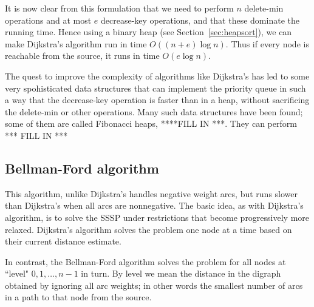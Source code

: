 It is now clear from this formulation that we need to perform $n$
delete-min operations and at most $e$ decrease-key operations, and
that these dominate the running time. Hence using a binary heap (see
Section~\ref{sec:heapsort}), we can make Dijkstra's
algorithm run in time $O((n + e) \log n)$. Thus if every node is reachable from the source, it runs in time $O(e\log n)$.

The quest to improve the complexity of algorithms like Dijkstra's has
led to some very spohisticated data structures that can implement the
priority queue in such a way that the decrease-key operation is faster
than in a heap, without sacrificing the delete-min or other operations.
Many such data structures have been found; some of them are called
Fibonacci heaps, ****FILL IN ***. They can perform *** FILL IN ***

\subsection{Bellman-Ford algorithm}
\label{subsec:bellford}

This algorithm, unlike Dijkstra's handles negative weight arcs, but runs slower than Dijkstra's when all arcs are nonnegative. The basic idea, as with Dijkstra's algorithm, is to solve the SSSP under  restrictions that become progressively more relaxed. Dijkstra's algorithm solves the problem one node at a time based on their current distance estimate. 

In contrast, the Bellman-Ford algorithm solves the problem for all nodes at ``level" $0, 1, \dots , n-1$ in turn. By level we mean the distance in the digraph obtained by ignoring all arc weights; in other words the smallest number of arcs in a path to that node from the source.

